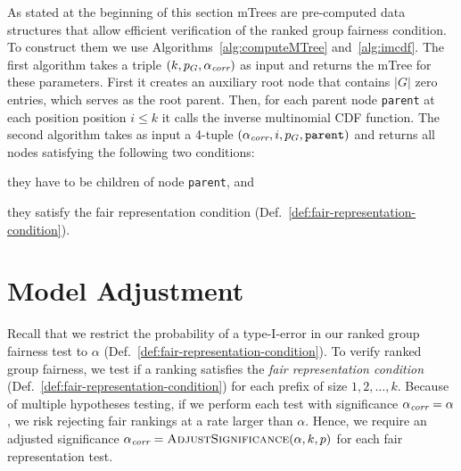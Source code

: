 

As stated at the beginning of this section mTrees are pre-computed data structures that allow efficient verification of the ranked group fairness condition.
%
To construct them we use Algorithms~\ref{alg:computeMTree} and~\ref{alg:imcdf}.
%
The first algorithm \algoComputeMTree takes a triple $(k,p_G,\alpha_\textit{corr})$ as input and returns the mTree for these parameters.
%
First it creates an auxiliary root node that contains $|G|$ zero entries, which serves as the root parent.
%
Then, for each parent node \texttt{parent} at each position position $i \leq k$ it calls the inverse multinomial CDF function.
%
The second algorithm \algoImcdf takes as input a 4-tuple $(\alpha_\textit{corr}, i, p_G, \texttt{parent})$ and returns all nodes satisfying the following two conditions:
\begin{inparaenum}[(i)]
	\item they have to be children of node \texttt{parent}, and
	\item they satisfy the fair representation condition (Def.~\ref{def:fair-representation-condition}).
\end{inparaenum}

\section{Model Adjustment}
\label{sec:model-adjustment}

Recall that we restrict the probability of a type-I-error in our ranked group fairness test to $\alpha$ (Def.~\ref{def:fair-representation-condition}).
%
To verify ranked group fairness, we test if a ranking satisfies the \emph{fair representation condition} (Def.~\ref{def:fair-representation-condition}) for each prefix  of size $1, 2, \dots, k$.
%
Because of  multiple hypotheses testing, if we perform each test with significance $\alpha_\textit{corr} = \alpha$, we risk rejecting fair rankings at a rate larger than $\alpha$.
%
Hence, we require an adjusted significance $\alpha_\textit{corr} = \text{{\sc AdjustSignificance}}(\alpha, k, p)$ for each fair representation test.
%

%

